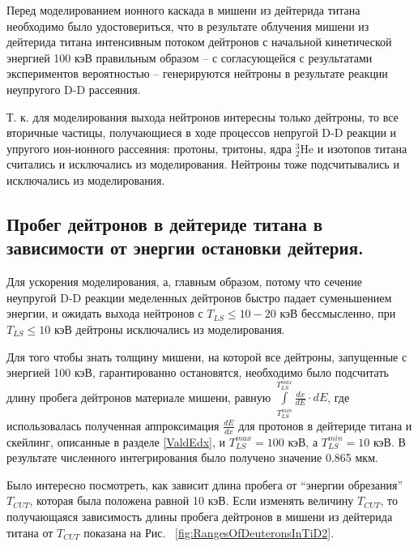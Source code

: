 \documentclass[a4paper,12pt]{article}
\begin{document}
\begin{large}
	Перед моделированием ионного каскада в мишени из дейтерида титана необходимо было удостовериться, что в результате облучения мишени из дейтерида титана интенсивным потоком дейтронов с начальной кинетической энергией 100 кэВ правильным образом -- с согласующейся с результатами экспериментов вероятностью -- генерируются нейтроны в результате реакции неупругого D-D рассеяния.
	
	Т. к. для моделирования выхода нейтронов интересны только дейтроны, то все вторичные частицы, получающиеся в ходе процессов непругой D-D реакции и упругого ион-ионного рассеяния: протоны, тритоны, ядра $^3_2$He и изотопов титана считались и исключались из моделирования.
	Нейтроны тоже подсчитывались и исключались из моделирования.  

\subsection{Пробег дейтронов в дейтериде титана в зависимости от энергии остановки дейтерия.}
\label{DeuteronRangesInTiD2}
	
	Для ускорения моделирования, а, главным образом, потому что сечение неупругой D-D реакции меделенных дейтронов быстро падает суменьшением энергии, и ожидать выхода нейтронов с $T_{LS} \leq 10-20$ кэВ бессмысленно, при $T_{LS} \leq 10$ кэВ дейтроны исключались из моделирования.
	
	Для того чтобы знать толщину мишени, на которой все дейтроны, запущенные с энергией 100 кэВ, гарантированно остановятся, необходимо было подсчитать длину пробега дейтронов материале мишени, равную $\int \limits^{T^{max}_{LS}}_{T^{min}_{LS}} \frac{dx}{dE} \cdot dE$, где использовалась полученная аппроксимация $\frac{dE}{dx}$ для протонов в дейтериде титана и скейлинг, описанные в разделе \ref{ValdEdx}, и $T^{max}_{LS}=100$ кэВ, а $T^{min}_{LS}=10$ кэВ. В результате численного интегрирования было получено значение 0.865 мкм.
	
	Было интересно посмотреть, как зависит длина пробега от ``энергии обрезания'' $T_{CUT}$, которая была положена равной 10 кэВ.
	Если изменять величину $T_{CUT}$, то получающаяся зависимость длины пробега дейтронов в мишени из дейтерида титана от $T_{CUT}$ показана на Рис. ~\ref{fig:RangesOfDeuteronsInTiD2}.
	  

\end{large}
\end{document}
